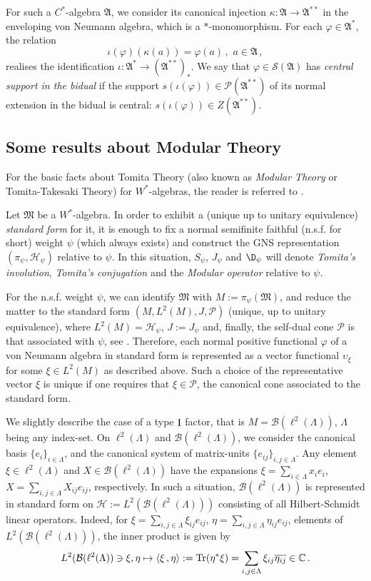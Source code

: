 \documentclass[12pt]{amsart}
\numberwithin{equation}{section}
\def\cb{{\mathcal B}}
\def\ch{{\mathcal H}}
\def\cp{{\mathcal P}}
\def\cs{{\mathcal S}}
\def\ga{{\mathfrak A}} \def\gpa{{\mathfrak a}}
\def\gam{{\mathfrak M}}\def\gpm{{\mathfrak m}}
\def\bc{{\mathbb C}}
\def\k{\kappa}
\def\f{\varphi}\def\ff{\phi} \def\F{\Phi}
\newcommand{\ty}[1]{\mathop{\rm {#1}}}
\begin{document}
For such a $C^*$-algebra $\ga$, we consider its canonical injection $\k:\ga\to\ga^{**}$ in the enveloping von Neumann algebra, which is a $*$-monomorphism. For each $\f\in\ga^*$, the relation
\begin{equation}
\label{ssbdh}
\iota(\f)(\k(a))=\f(a)\,,\,\,a\in\ga\,,
\end{equation}
realises the identification $\iota:\ga^*\to(\ga^{**})_*$. We say that $\f\in\cs(\ga)$ has {\it central support in the bidual} if the support 
$s(\iota(\f))\in\cp(\ga^{**})$ of its normal extension in the bidual is central: $s(\iota(\f))\in Z(\ga^{**})$.


\subsection{Some results about Modular Theory} 
For the basic facts about Tomita Theory (also known as {\it Modular Theory} or Tomita-Takesaki Theory) for $W^*$-algebras, the reader is referred to \cite{BR, H, S, SZ}.

Let $\gam$ be a $W^*$-algebra. In order to exhibit a (unique up to unitary equivalence) {\it standard form} for it, it is enough to fix a normal semifinite faithful (n.s.f. for short) weight $\psi$ (which always exists) and construct the GNS representation $(\pi_\psi, \ch_\psi)$ relative to $\psi$. In this situation, $S_\psi$, $J_\psi$ and $\D_\psi$ will denote {\it Tomita's involution}, {\it Tomita's conjugation} and the {\it Modular operator} relative to $\psi$.

For the n.s.f. weight $\psi$, we can identify
$\gam$ with $M:=\pi_\psi(\gam)$, and reduce the matter to the standard form $(M, L^2(M), J, \cp)$ (unique, up to unitary equivalence), where $L^2(M)=\ch_\psi$, $J:=J_\psi$ and, finally, the self-dual cone $\cp$ is that associated with $\psi$, see \cite{H}. 
Therefore, each normal positive functional $\f$ of a von Neumann algebra in standard form is represented as a vector functional 
$\upsilon_{\xi}$ for some $\xi\in L^2(M)$ as described above. Such a choice of the representative vector $\xi$ is unique if one requires that $\xi\in\cp$, the canonical cone associated to the standard form.

We slightly describe the case of a type $\ty{I}$ factor, that is $M=\cb(\ell^2(\Lambda))$, $\Lambda$ being any index-set. On $\ell^2(\Lambda)$ and $\cb(\ell^2(\Lambda))$, we consider the canonical basis $\{e_i\}_{i\in \Lambda}$, and the canonical system of matrix-units $\{e_{ij}\}_{i,j\in \Lambda}$. Any element $\xi\in\ell^2(\Lambda)$ and $X\in\cb(\ell^2(\Lambda))$ have the expansions
$\xi=\sum_{i\in \Lambda}x_ie_i$, $X=\sum_{i,j\in \Lambda}X_{ij}e_{ij}$, respectively.
In such a situation, $\cb(\ell^2(\Lambda))$ is represented in standard form on $\ch:=L^2(\cb(\ell^2(\Lambda)))$ consisting of all Hilbert-Schmidt linear operators. Indeed, for 
$\xi=\sum_{i,j\in \Lambda}\xi_{ij}e_{ij}$, $\eta=\sum_{i,j\in \Lambda}\eta_{ij}e_{ij}$,
elements of $L^2(\cb(\ell^2(\Lambda)))$,
the inner product is given by
$$
L^2(\cb(\ell^2(\Lambda))\ni \xi,\eta\mapsto \langle \xi\,,\eta\rangle:={\rm Tr}(\eta^*\xi)=\sum_{i,j\in \Lambda} \xi_{ij}\overline{\eta_{ij}}\in\bc\,.
$$
 
\end{document}
